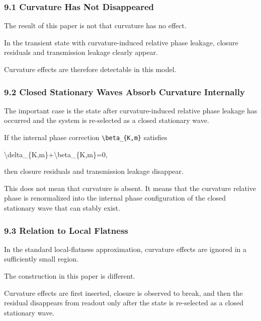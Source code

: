 \documentclass[
  a4paper,
]{article}
\newenvironment{Shaded}{}{}
\newcommand{\NormalTok}[1]{#1}
\begin{document}
\subsubsection{9.1 Curvature Has Not
Disappeared}\label{curvature-has-not-disappeared}

The result of this paper is not that curvature has no effect.

In the transient state with curvature-induced relative phase leakage,
closure residuals and transmission leakage clearly appear.

Curvature effects are therefore detectable in this model.

\subsubsection{9.2 Closed Stationary Waves Absorb Curvature
Internally}\label{closed-stationary-waves-absorb-curvature-internally}

The important case is the state after curvature-induced relative phase
leakage has occurred and the system is re-selected as a closed
stationary wave.

If the internal phase correction \texttt{\textbackslash{}beta\_\{K,m\}}
satisfies

\begin{Shaded}
\begin{Highlighting}[]
\NormalTok{\textbackslash{}delta\_\{K,m\}+\textbackslash{}beta\_\{K,m\}=0,}
\end{Highlighting}
\end{Shaded}

then closure residuals and transmission leakage disappear.

This does not mean that curvature is absent. It means that the curvature
relative phase is renormalized into the internal phase configuration of
the closed stationary wave that can stably exist.

\subsubsection{9.3 Relation to Local
Flatness}\label{relation-to-local-flatness}

In the standard local-flatness approximation, curvature effects are
ignored in a sufficiently small region.

The construction in this paper is different.

Curvature effects are first inserted, closure is observed to break, and
then the residual disappears from readout only after the state is
re-selected as a closed stationary wave.
\end{document}
